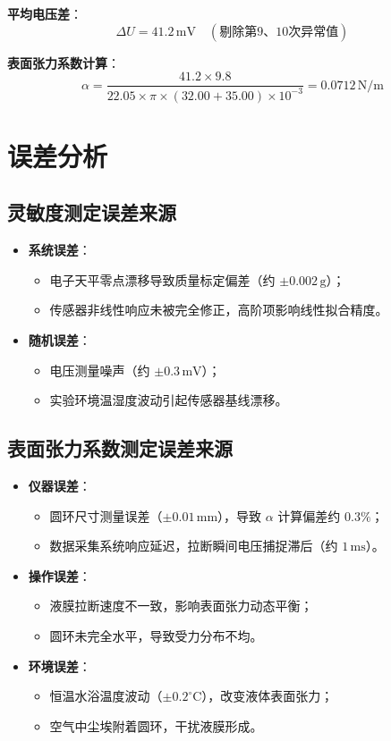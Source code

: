 \documentclass[12pt,a4paper]{article}
\begin{document}
\textbf{平均电压差}：
\begin{equation}
\Delta U = 41.2 \, \text{mV} \quad (\text{剔除第9、10次异常值})
\end{equation}

\textbf{表面张力系数计算}：
\begin{equation}
\alpha = \frac{41.2 \times 9.8}{22.05 \times \pi \times (32.00 + 35.00) \times 10^{-3}} = 0.0712 \, \text{N/m}
\end{equation}

\section{误差分析}

\subsection{灵敏度测定误差来源}
\begin{itemize}
\item \textbf{系统误差}：
\begin{itemize}
\item 电子天平零点漂移导致质量标定偏差（约 $\pm 0.002 \, \text{g}$）；
\item 传感器非线性响应未被完全修正，高阶项影响线性拟合精度。
\end{itemize}
\item \textbf{随机误差}：
\begin{itemize}
\item 电压测量噪声（约 $\pm 0.3 \, \text{mV}$）；
\item 实验环境温湿度波动引起传感器基线漂移。
\end{itemize}
\end{itemize}

\subsection{表面张力系数测定误差来源}
\begin{itemize}
\item \textbf{仪器误差}：
\begin{itemize}
\item 圆环尺寸测量误差（$\pm 0.01 \, \text{mm}$），导致 $\alpha$ 计算偏差约 $0.3\%$；
\item 数据采集系统响应延迟，拉断瞬间电压捕捉滞后（约 $1 \, \text{ms}$）。
\end{itemize}
\item \textbf{操作误差}：
\begin{itemize}
\item 液膜拉断速度不一致，影响表面张力动态平衡；
\item 圆环未完全水平，导致受力分布不均。
\end{itemize}
\item \textbf{环境误差}：
\begin{itemize}
\item 恒温水浴温度波动（$\pm 0.2^\circ \text{C}$），改变液体表面张力；
\item 空气中尘埃附着圆环，干扰液膜形成。
\end{itemize}
\end{itemize}
\end{document}
